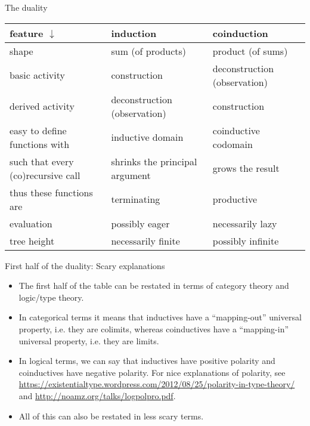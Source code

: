 \documentclass{beamer}
\begin{document}
\begin{frame}{The duality}
\begin{tabular}{ | p{3cm} | p{3cm} | p{3cm} | }
	\hline
	feature $\downarrow$ & induction & coinduction \\\hline
	shape & sum (of products) & product (of sums) \\\hline
	basic activity & construction & deconstruction (observation) \\\hline
	derived activity & deconstruction (observation) & construction \\\hline
	easy to define functions with & inductive domain & coinductive codomain \\\hline
	such that every (co)recursive call & shrinks the principal argument & grows the result \\\hline
	thus these functions are & terminating & productive \\\hline
	evaluation & possibly eager & necessarily lazy \\\hline
	tree height & necessarily finite & possibly infinite \\\hline
\end{tabular}
\end{frame}

\begin{frame}{First half of the duality: Scary explanations}
\begin{itemize}
	\item The first half of the table can be restated in terms of category theory and logic/type theory.
	\item In categorical terms it means that inductives have a ``mapping-out'' universal property, i.e. they are colimits, whereas coinductives have a ``mapping-in'' universal property, i.e. they are limits.
	\item In logical terms, we can say that inductives have positive polarity and coinductives have negative polarity. For nice explanations of polarity, see \url{https://existentialtype.wordpress.com/2012/08/25/polarity-in-type-theory/} and \url{http://noamz.org/talks/logpolpro.pdf}.
	\item All of this can also be restated in less scary terms.
\end{itemize}
\end{frame}
\end{document}
